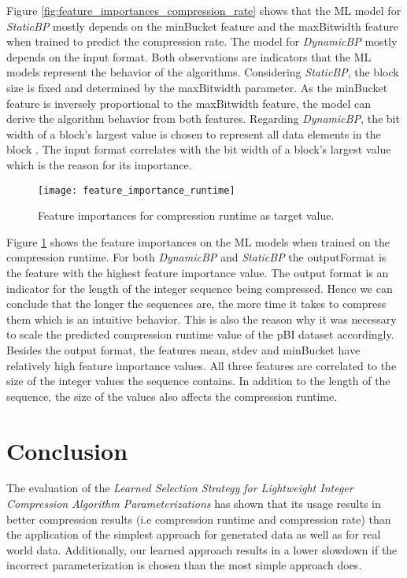 Figure \ref{fig:feature_importances_compression_rate} shows that the ML model for \emph{StaticBP} mostly depends on the minBucket feature and the maxBitwidth feature when trained to predict the compression rate. The model for \emph{DynamicBP} mostly depends on the input format. Both observations are indicators that the ML models represent the behavior of the algorithms.
Considering \emph{StaticBP}, the block size is fixed and determined by the maxBitwidth parameter. As the minBucket feature is inversely proportional to the maxBitwidth feature, the model can derive the algorithm behavior from both features.
Regarding \emph{DynamicBP}, the bit width of a block's largest value is chosen to represent all data elements in the block \cite{Woltmann2021}. The input format correlates with the bit width of a block's largest value which is the reason for its importance.
\begin{figure}[h]
    \centering
    \texttt{[image: feature\_importance\_runtime]}
    \caption{Feature importances for compression runtime as target value.}
    \label{fig:feature_importances_compression_runtime}
\end{figure}

Figure \ref{fig:feature_importances_compression_runtime} shows the feature importances on the ML models when trained on the compression runtime. For both \emph{DynamicBP} and \emph{StaticBP} the outputFormat is the feature with the highest feature importance value. The output format is an indicator for the length of the integer sequence being compressed. Hence we can conclude that the longer the sequences are, the more time it takes to compress them which is an intuitive behavior. This is also the reason why it was necessary to scale the predicted compression runtime value of the pBI dataset accordingly.
Besides the output format, the features mean, stdev and minBucket have relatively high feature importance values. All three features are correlated to the size of the integer values the sequence contains. In addition to the length of the sequence, the size of the values also affects the compression runtime.

\section{Conclusion}
The evaluation of the \emph{Learned Selection Strategy for Lightweight Integer Compression Algorithm Parameterizations} has shown that its usage results in better compression results (i.e compression runtime and compression rate) than the application of the simplest approach for generated data as well as for real world data. Additionally, our learned approach results in a lower slowdown if the incorrect parameterization is chosen than the most simple approach does.